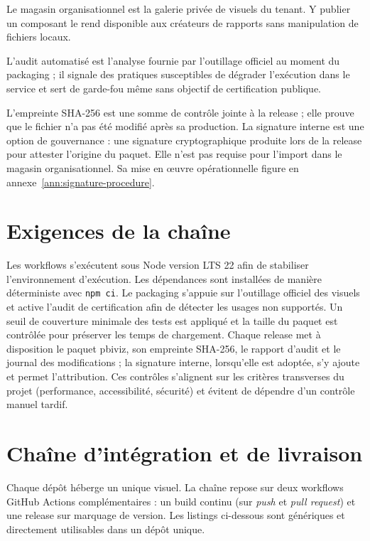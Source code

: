 Le magasin organisationnel est la galerie privée de visuels du tenant. Y publier un composant le rend disponible aux créateurs de rapports sans manipulation de fichiers locaux.

L’audit automatisé est l’analyse fournie par l’outillage officiel au moment du packaging ; il signale des pratiques susceptibles de dégrader l’exécution dans le service et sert de garde-fou même sans objectif de certification publique.

L’empreinte SHA-256 est une somme de contrôle jointe à la release ; elle prouve que le fichier n’a pas été modifié après sa production. La signature interne est une option de gouvernance : une signature cryptographique produite lors de la release pour attester l’origine du paquet. Elle n’est pas requise pour l’import dans le magasin organisationnel. Sa mise en œuvre opérationnelle figure en annexe~\ref{ann:signature-procedure}.

\section{Exigences de la chaîne}
\label{sec:exigences-ci}

Les workflows s’exécutent sous Node version LTS 22 afin de stabiliser l’environnement d’exécution. Les dépendances sont installées de manière déterministe avec \texttt{npm ci}. Le packaging s’appuie sur l’outillage officiel des visuels et active l’audit de certification afin de détecter les usages non supportés. Un seuil de couverture minimale des tests est appliqué et la taille du paquet est contrôlée pour préserver les temps de chargement. Chaque release met à disposition le paquet pbiviz, son empreinte SHA-256, le rapport d’audit et le journal des modifications ; la signature interne, lorsqu’elle est adoptée, s’y ajoute et permet l’attribution. Ces contrôles s’alignent sur les critères transverses du projet (performance, accessibilité, sécurité) et évitent de dépendre d’un contrôle manuel tardif.

\section{Chaîne d’intégration et de livraison}
\label{sec:ci-cd}

Chaque dépôt héberge un unique visuel. La chaîne repose sur deux workflows GitHub Actions complémentaires : un build continu (sur \textit{push} et \textit{pull request}) et une release sur marquage de version. Les listings ci-dessous sont génériques et directement utilisables dans un dépôt unique.

